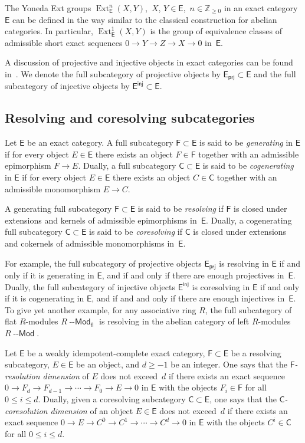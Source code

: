 \documentclass[12pt,a4paper]{amsart}
\newcommand{\+}{\nobreakdash-}
\renewcommand{\:}{\colon}
\newcommand{\rarrow}{\longrightarrow}
\DeclareMathOperator{\Ext}{Ext}
\newcommand{\Modl}{{\operatorname{\mathsf{--Mod}}}}
\newcommand{\prj}{\mathsf{prj}}
\newcommand{\inj}{\mathsf{inj}}
\newcommand{\fl}{\mathsf{fl}}
\newcommand{\sE}{\mathsf E}
\newcommand{\sF}{\mathsf F}
\newcommand{\sC}{\mathsf C}
\newcommand{\boZ}{\mathbb Z}
\theoremstyle{plain}
\theoremstyle{definition}
\begin{document}
 The Yoneda Ext groups $\Ext_\sE^n(X,Y)$, \,$X$, $Y\in\sE$,
\,$n\in\boZ_{\ge0}$ in an exact category $\sE$ can be defined in
the way similar to the classical construction for abelian categories.
 In particular, $\Ext_\sE^1(X,Y)$ is the group of equivalence
classes of admissible short exact sequences $0\rarrow Y\rarrow Z
\rarrow X\rarrow0$ in~$\sE$.

 A discussion of projective and injective objects in exact categories
can be found in~\cite[Section~11]{Bueh}.
 We denote the full subcategory of projective objects by
$\sE_\prj\subset\sE$ and the full subcategory of injective objects
by $\sE^\inj\subset\sE$.

\subsection{Resolving and coresolving subcategories}
\label{resolving-subsecn}
 Let $\sE$ be an exact category.
 A full subcategory $\sF\subset\sE$ is said to be \emph{generating}
in $\sE$ if for every object $E\in\sE$ there exists an object
$F\in\sF$ together with an admissible epimorphism $F\rarrow E$.
 Dually, a full subcategory $\sC\subset\sE$ is said to be
\emph{cogenerating} in $\sE$ if for every object $E\in\sE$ there
exists an object $C\in\sC$ together with an admissible monomorphism
$E\rarrow C$.

 A generating full subcategory $\sF\subset\sE$ is said to be
\emph{resolving} if $\sF$ is closed under extensions and kernels of
admissible epimorphisms in~$\sE$.
 Dually, a cogenerating full subcategory $\sC\subset\sE$ is said to be
\emph{coresolving} if $\sC$ is closed under extensions and cokernels
of admissible monomorphisms in~$\sE$.

 For example, the full subcategory of projective objects $\sE_\prj$
is resolving in $\sE$ if and only if it is generating in $\sE$, and
if and only if there are enough projectives in~$\sE$.
 Dually, the full subcategory of injective objects $\sE^\inj$ is
coresolving in $\sE$ if and only if it is cogenerating in $\sE$, and
if and and only if there are enough injectives in~$\sE$.
 To give yet another example, for any associative ring $R$,
the full subcategory of flat $R$\+modules $R\Modl_\fl$ is resolving
in the abelian category of left $R$\+modules $R\Modl$.

 Let $\sE$ be a weakly idempotent-complete exact category,
$\sF\subset\sE$ be a resolving subcategory, $E\in\sE$ be an object,
and $d\ge-1$ be an integer.
 One says that the \emph{$\sF$\+resolution dimension} of $E$ does not
exceed~$d$ if there exists an exact sequence $0\rarrow F_d\rarrow
F_{d-1}\rarrow\dotsb\rarrow F_0\rarrow E\rarrow0$ in $\sE$ with
the objects $F_i\in\sF$ for all $0\le i\le d$.
 Dually, given a coresolving subcategory $\sC\subset\sE$, one says that
the \emph{$\sC$\+coresolution dimension} of an object $E\in\sE$ does
not exceed~$d$ if there exists an exact sequence $0\rarrow E\rarrow
C^0\rarrow C^1\rarrow\dotsb\rarrow C^d\rarrow0$ in $\sE$ with
the objects $C^i\in\sC$ for all $0\le i\le d$.
\end{document}
